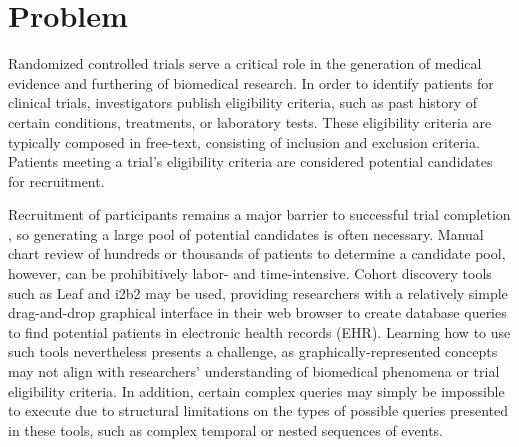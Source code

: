 \documentclass[../main.tex]{subfiles}
\begin{document}
\section{Problem}

Randomized controlled trials serve a critical role in the generation of medical evidence and furthering of biomedical research. In order to identify patients for clinical trials, investigators publish eligibility criteria, such as past history of certain conditions, treatments, or laboratory tests. These eligibility criteria are typically composed in free-text, consisting of inclusion and exclusion criteria. Patients meeting a trial's eligibility criteria are considered potential candidates for recruitment. 

Recruitment of participants remains a major barrier to successful trial completion \cite{richesson2013electronic}, so generating a large pool of potential candidates is often necessary. Manual chart review of hundreds or thousands of patients to determine a candidate pool, however, can be prohibitively labor- and time-intensive. Cohort discovery tools such as Leaf \cite{dobbins2019leaf} and i2b2 \cite{murphy2010serving} may be used, providing researchers with a relatively simple drag-and-drop graphical interface in their web browser to create database queries to find potential patients in electronic health records (EHR). Learning how to use such tools nevertheless presents a challenge, as graphically-represented concepts may not align with researchers' understanding of biomedical phenomena or trial eligibility criteria. In addition, certain complex queries may simply be impossible to execute due to structural limitations on the types of possible queries presented in these tools, such as complex temporal or nested sequences of events.
\end{document}
